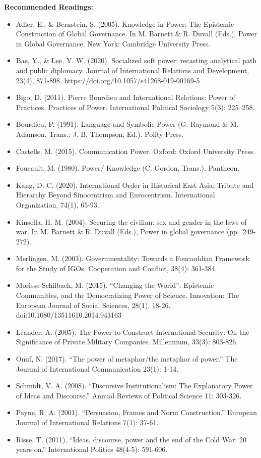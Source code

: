 \documentclass[
  letterpaper,
  DIV=11,
  numbers=noendperiod]{scrartcl}
\providecommand{\tightlist}{%
  \setlength{\itemsep}{0pt}\setlength{\parskip}{0pt}}\usepackage{longtable,booktabs,array}
\begin{document}
\textbf{Recommended Readings:}

\begin{itemize}
\tightlist
\item
  Adler, E., \& Bernstein, S. (2005). Knowledge in Power: The Epistemic
  Construction of Global Governance. In M. Barnett \& R. Duvall (Eds.),
  Power in Global Governance. New York: Cambridge University Press.
\item
  Bae, Y., \& Lee, Y. W. (2020). Socialized soft power: recasting
  analytical path and public diplomacy. Journal of International
  Relations and Development, 23(4), 871-898.
  https://doi.org/10.1057/s41268-019-00169-5
\item
  Bigo, D. (2011). Pierre Bourdieu and International Relations: Power of
  Practices, Practices of Power. International Political Sociology 5(3):
  225--258.
\item
  Bourdieu, P. (1991). Language and Symbolic Power (G. Raymond \& M.
  Adamson, Trans.; J. B. Thompson, Ed.). Polity Press.
\item
  Castells, M. (2015). Communication Power. Oxford: Oxford University
  Press.
\item
  Foucault, M. (1980). Power/ Knowledge (C. Gordon, Trans.). Pantheon.
\item
  Kang, D. C. (2020). International Order in Historical East Asia:
  Tribute and Hierarchy Beyond Sinocentrism and Eurocentrism.
  International Organization, 74(1), 65-93.
\item
  Kinsella, H. M. (2004). Securing the civilian: sex and gender in the
  laws of war. In M. Barnett \& R. Duvall (Eds.), Power in global
  governance (pp.~249-272).
\item
  Merlingen, M. (2003). Governmentality: Towards a Foucauldian Framework
  for the Study of IGOs. Cooperation and Conflict, 38(4): 361-384.
\item
  Morisse-Schilbach, M. (2015). ``Changing the World'': Epistemic
  Communities, and the Democratizing Power of Science. Innovation: The
  European Journal of Social Sciences, 28(1), 18-26.
  doi:10.1080/13511610.2014.943163
\item
  Leander, A. (2005). The Power to Construct International Security: On
  the Significance of Private Military Companies. Millennium, 33(3):
  803-826.
\item
  Onuf, N. (2017). ``The power of metaphor/the metaphor of power.'' The
  Journal of International Communication 23(1): 1-14.
\item
  Schmidt, V. A. (2008). ``Discursive Institutionalism: The Explanatory
  Power of Ideas and Discourse.'' Annual Reviews of Political Science
  11: 303-326.
\item
  Payne, R. A. (2001). ``Persuasion, Frames and Norm Construction.''
  European Journal of International Relations 7(1): 37-61.
\item
  Risse, T. (2011). ``Ideas, discourse, power and the end of the Cold
  War: 20 years on.'' International Politics 48(4-5): 591-606.
\end{itemize}
\end{document}
